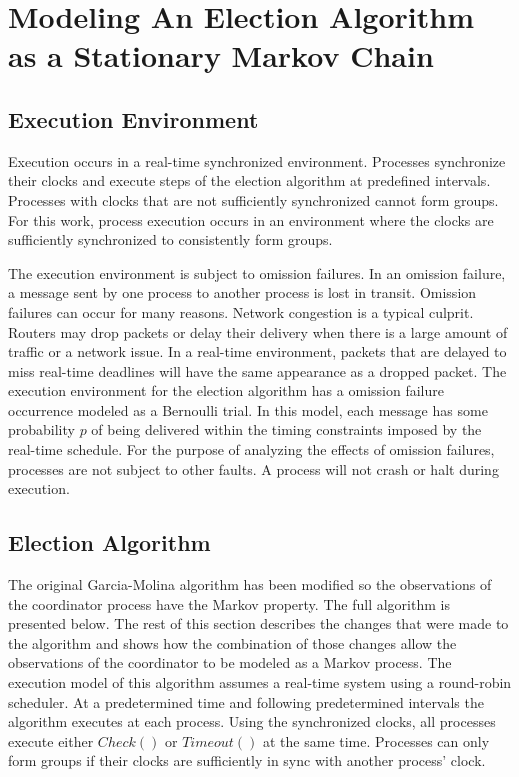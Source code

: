 \section{Modeling An Election Algorithm as a Stationary Markov Chain}



\subsection{Execution Environment}

Execution occurs in a real-time synchronized environment.
Processes synchronize their clocks and execute steps of the election algorithm at predefined intervals.
Processes with clocks that are not sufficiently synchronized cannot form groups.
For this work, process execution occurs in an environment where the clocks are sufficiently synchronized to consistently form groups.

The execution environment is subject to omission failures.
In an omission failure, a message sent by one process to another process is lost in transit.
Omission failures can occur for many reasons.
Network congestion is a typical culprit.
Routers may drop packets or delay their delivery when there is a large amount of traffic or a network issue.
In a real-time environment, packets that are delayed to miss real-time deadlines will have the same appearance as a dropped packet.
The execution environment for the election algorithm has a omission failure occurrence modeled as a Bernoulli trial.
In this model, each message has some probability $p$ of being delivered within the timing constraints imposed by the real-time schedule.
For the purpose of analyzing the effects of omission failures, processes are not subject to other faults.
A process will not crash or halt during execution.

\subsection{Election Algorithm}

The original Garcia-Molina algorithm has been modified so the observations of the coordinator process have the Markov property.
The full algorithm is presented below.
The rest of this section describes the changes that were made to the algorithm and shows how the combination of those changes allow the observations of the coordinator to be modeled as a Markov process.
The execution model of this algorithm assumes a real-time system using a round-robin scheduler.
At a predetermined time and following predetermined intervals the algorithm executes at each process.
Using the synchronized clocks, all processes execute either $Check()$ or $Timeout()$ at the same time.
Processes can only form groups if their clocks are sufficiently in sync with another process' clock.

